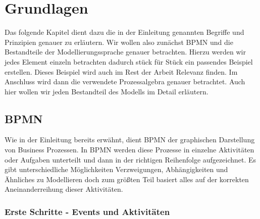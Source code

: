 
\chapter{Grundlagen} %

\label{Chapter2} %







Das folgende Kapitel dient dazu die in der Einleitung genannten Begriffe und Prinzipien genauer zu erläutern. Wir wollen also zunächst BPMN und die Bestandteile der Modellierungssprache genauer betrachten. Hierzu werden wir jedes Element einzeln betrachten dadurch stück für Stück ein passendes Beispiel erstellen. Dieses Beispiel wird auch im Rest der Arbeit Relevanz finden. 
Im Anschluss wird dann die verwendete Prozessalgebra genauer betrachtet. Auch hier wollen wir jeden Bestandteil des Modells im Detail erläutern.


\section{BPMN}
Wie in der Einleitung bereits erwähnt, dient BPMN der graphischen Darstellung von Business Prozessen. In BPMN werden diese Prozesse in einzelne Aktivitäten oder Aufgaben unterteilt und dann in der richtigen Reihenfolge aufgezeichnet. Es gibt unterschiedliche Möglichkeiten Verzweigungen, Abhängigkeiten und Ähnliches zu Modellieren doch zum größten Teil basiert alles auf der korrekten Aneinanderreihung dieser Aktivitäten.
\subsection{Erste Schritte - Events und Aktivitäten}

